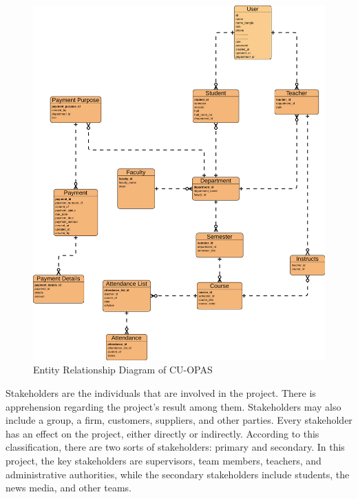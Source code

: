 \begin{figure}[H]
    \centering
    \label{fig:erd}
    \includegraphics[width=1\textwidth]{images/erd}
    \caption{Entity Relationship Diagram of CU-OPAS}
\end{figure}
Stakeholders are the individuals that are involved in the project. There is apprehension regarding the project's result among them. Stakeholders may also include a group, a firm, customers, suppliers, and other parties. Every stakeholder has an effect on the project, either directly or indirectly. According to this classification, there are two sorts of stakeholders: primary and secondary. In this project, the key stakeholders are supervisors, team members, teachers, and administrative authorities, while the secondary stakeholders include students, the news media, and other teams.
\clearpage
